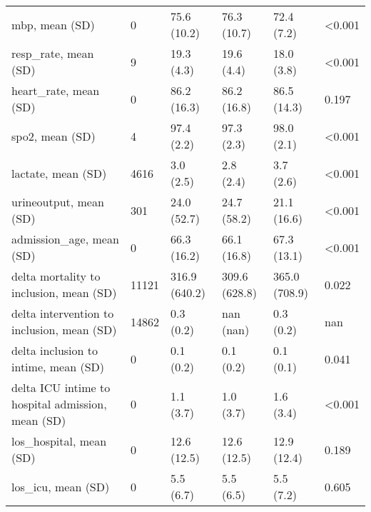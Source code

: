 \begin{tabular}{llllll}
mbp, mean (SD)                                    &       0 &    75.6 (10.2) &       76.3 (10.7) &             72.4 (7.2) &  <0.001 \\
resp\_rate, mean (SD)                              &       9 &     19.3 (4.3) &        19.6 (4.4) &             18.0 (3.8) &  <0.001 \\
heart\_rate, mean (SD)                             &       0 &    86.2 (16.3) &       86.2 (16.8) &            86.5 (14.3) &   0.197 \\
spo2, mean (SD)                                   &       4 &     97.4 (2.2) &        97.3 (2.3) &             98.0 (2.1) &  <0.001 \\
lactate, mean (SD)                                &    4616 &      3.0 (2.5) &         2.8 (2.4) &              3.7 (2.6) &  <0.001 \\
urineoutput, mean (SD)                            &     301 &    24.0 (52.7) &       24.7 (58.2) &            21.1 (16.6) &  <0.001 \\
admission\_age, mean (SD)                          &       0 &    66.3 (16.2) &       66.1 (16.8) &            67.3 (13.1) &  <0.001 \\
delta mortality to inclusion, mean (SD)           &   11121 &  316.9 (640.2) &     309.6 (628.8) &          365.0 (708.9) &   0.022 \\
delta intervention to inclusion, mean (SD)        &   14862 &      0.3 (0.2) &         nan (nan) &              0.3 (0.2) &     nan \\
delta inclusion to intime, mean (SD)              &       0 &      0.1 (0.2) &         0.1 (0.2) &              0.1 (0.1) &   0.041 \\
delta ICU intime to hospital admission, mean (SD) &       0 &      1.1 (3.7) &         1.0 (3.7) &              1.6 (3.4) &  <0.001 \\
los\_hospital, mean (SD)                           &       0 &    12.6 (12.5) &       12.6 (12.5) &            12.9 (12.4) &   0.189 \\
los\_icu, mean (SD)                                &       0 &      5.5 (6.7) &         5.5 (6.5) &              5.5 (7.2) &   0.605 \\
\bottomrule
\end{tabular}
